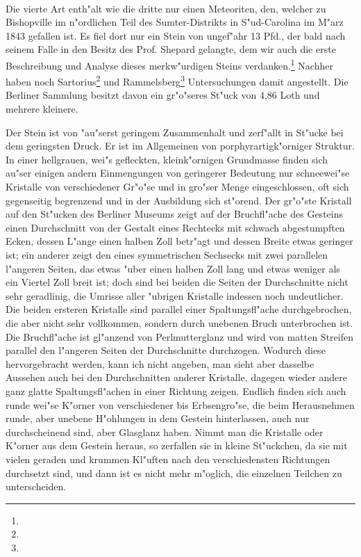 \documentclass[a4paper, 11pt, oneside]{article}
\begin{document}
\paragraph{}
Die vierte Art enth"alt wie die dritte nur einen Meteoriten, den, welcher zu Bishopville im n"ordlichen Teil des Sumter-Distrikts in S"ud-Carolina im M"arz 1843 gefallen ist. Es fiel dort nur ein Stein von ungef"ahr 13 Pfd., der bald nach seinem Falle in den Besitz des Prof. Shepard gelangte, dem wir auch die erste Beschreibung und Analyse dieses merkw"urdigen Steins verdanken.\footnote{} Nachher haben noch Sartorius\footnote{} und Rammelsberg\footnote{} Untersuchungen damit angestellt. Die Berliner Sammlung besitzt davon ein gr"o"seres St"uck von 4,86 Loth und mehrere kleinere.

Der Stein ist von "au"serst geringem Zusammenhalt und zerf"allt in St"ucke bei dem geringsten Druck. Er ist im Allgemeinen von porphyrartigk"orniger Struktur. In einer hellgrauen, wei"s gefleckten, kleink"ornigen Grundmasse finden sich au"ser einigen andern Einmengungen von geringerer Bedeutung nur schneewei"se Kristalle von verschiedener Gr"o"se und in gro"ser Menge eingeschlossen, oft sich gegenseitig begrenzend und in der Ausbildung sich st"orend. Der gr"o"ste Kristall auf den St"ucken des Berliner Museums zeigt auf der Bruchfl"ache des Gesteins einen Durchschnitt von der Gestalt eines Rechtecks mit schwach abgestumpften Ecken, dessen L"ange einen halben Zoll betr"agt und dessen Breite etwas geringer ist; ein anderer zeigt den eines symmetrischen Sechsecks mit zwei parallelen l"angeren Seiten, das etwas "uber einen halben Zoll lang und etwas weniger als ein Viertel Zoll breit ist; doch sind bei beiden die Seiten der Durchschnitte nicht sehr geradlinig, die Umrisse aller "ubrigen Kristalle indessen noch undeutlicher. Die beiden ersteren Kristalle sind parallel einer Spaltungsfl"ache durchgebrochen, die aber nicht sehr vollkommen, sondern durch unebenen Bruch unterbrochen ist. Die Bruchfl"ache ist gl"anzend von Perlmutterglanz und wird von matten Streifen parallel den l"angeren Seiten der Durchschnitte durchzogen. Wodurch diese hervorgebracht werden, kann ich nicht angeben, man sieht aber dasselbe Aussehen auch bei den Durchschnitten anderer Kristalle, dagegen wieder andere ganz glatte Spaltungsfl"achen in einer Richtung zeigen. Endlich finden sich auch runde wei"se K"orner von verschiedener bis Erbsengro"se, die beim Herausnehmen runde, aber unebene H"ohlungen in dem Gestein hinterlassen, auch nur durchscheinend sind, aber Glasglanz haben. Nimmt man die Kristalle oder K"orner aus dem Gestein heraus, so zerfallen sie in kleine St"uckchen, da sie mit vielen geraden und krummen Kl"uften nach den verschiedensten Richtungen durchsetzt sind, und dann ist es nicht mehr m"oglich, die einzelnen Teilchen zu unterscheiden.
\end{document}
